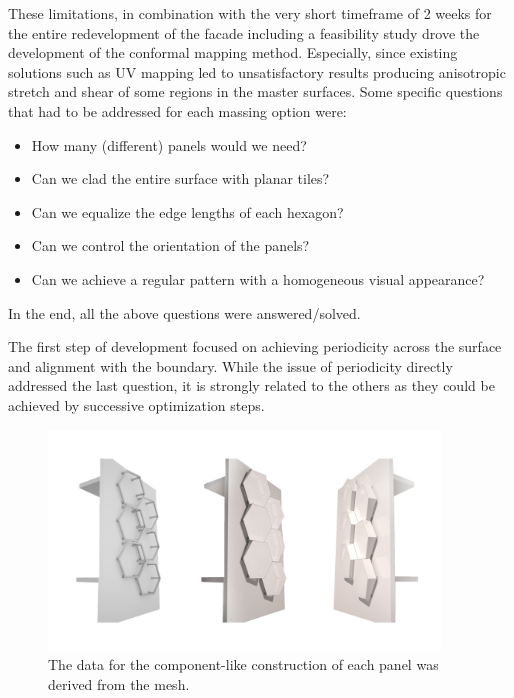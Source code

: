 \documentclass[article.tex]{subfiles}
\begin{document}
These limitations, in combination with the very short timeframe of 2
weeks for the entire redevelopment of the facade including a
feasibility study drove the development of the conformal mapping
method. Especially, since existing solutions such as UV mapping led to
unsatisfactory results producing anisotropic stretch and shear of some
regions in the master surfaces.  Some specific questions that had to
be addressed for each massing option were:

\begin{itemize}
\item How many (different) panels would we need?
\item Can we clad the entire surface with planar tiles?
\item Can we equalize the edge lengths of each hexagon?
\item Can we control the orientation of the panels?
\item Can we achieve a regular pattern with a homogeneous visual
  appearance?
\end{itemize}

In the end, all the above questions were answered/solved.

The first step of development focused on achieving periodicity across
the surface and alignment with the boundary. While the issue of
periodicity directly addressed the last question, it is strongly
related to the others as they could be achieved by successive
optimization steps.

\begin{figure}[t]
  \centering
  \includegraphics[width=0.93\textwidth]{images/henn/panel_construction.jpg}
  \caption{The data for the component-like construction of each panel was derived from the mesh.}
  \label{fig:panel_construction}
\end{figure}
\end{document}
